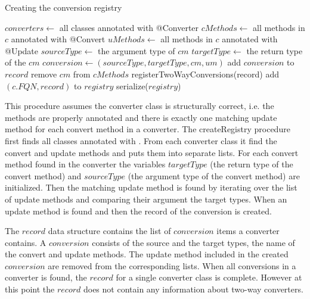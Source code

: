 \begin{algorithm}
\caption{Creating the conversion registry}\label{alg:convreg}
	\begin{algorithmic}[1]
			\State $converters \gets $ all classes annotated with @Converter
			\State $cMethods \gets $ all methods in $c$ annotated with @Convert
			\State $uMethods \gets$ all methods in $c$ annotated with @Update
			\State $sourceType \gets $ the argument type of $cm$
			\State $targetType \gets $ the return type of the $cm$
					\State $conversion \gets (sourceType, targetType, cm, um)$
					\State add $conversion$ to $record$
					\State remove $cm$ from $cMethods$
				\EndIf
			\EndFor
			\EndFor
			\State registerTwoWayConversions(record)
			\State add $(c.FQN, record)$ to $registry$
			\EndFor
			\State serialize($registry$)
		\EndProcedure
	\end{algorithmic}
\end{algorithm}


This procedure assumes the converter class is structurally correct, i.e. the methods are properly annotated and there is exactly one matching update method for each convert method in a converter. 
The createRegistry procedure first finds all classes annotated with . 
From each converter class it find the convert and update methods and puts them into separate lists. 
For each convert method found in the converter the variables $targetType$ (the return type of the convert method) and $sourceType$ (the argument type of the convert method) are initialized. 
Then the matching update method is found by iterating over the list of update methods and comparing their argument the target types. 
When an update method is found and then the record of the conversion is created. 

The $record$ data structure contains the list of $conversion$ items a converter contains. A $conversion$ consists of the source and the target types, the name of the convert and update methods. 
The update method included in the created $conversion$ are removed from the corresponding lists. 
When all conversions in a converter is found, the $record$ for a single converter class is complete. 
However at this point the $record$ does not contain any information about two-way converters.

